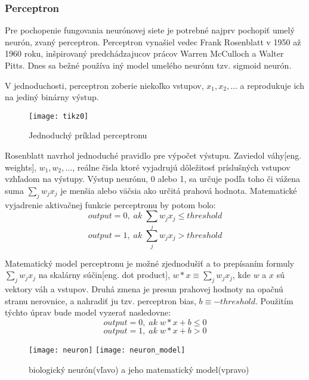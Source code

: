 \subsubsection{Perceptron}
Pre pochopenie fungovania neurónovej siete je potrebné najprv pochopiť umelý neurón, zvaný perceptron.
Perceptron vynašiel vedec Frank Rosenblatt v 1950 až 1960 roku, inšpirovaný predchádzajucov prácov Warren McCulloch a Walter Pitts.
Dnes sa bežné používa iný model umelého neurónu tzv. sigmoid neurón\cite{odkaz:HandwrittenDigitRecognision}.

V jednoduchosti, perceptron zoberie niekoľko vstupov, $x_1, x_2, \dots$ a reprodukuje ich na jediný binárny výstup.
\begin{figure}[H]
	\centering
	\texttt{[image: tikz0]}
	\caption{Jednoduchý príklad perceptronu\cite{odkaz:HandwrittenDigitRecognision}}
	\label{pic:Perceptron}
\end{figure}
Rosenblatt navrhol jednoduché pravidlo pre výpočet výstupu.
Zaviedol váhy[eng. weights], $w_1, w_2, \dots$,
    reálne čisla ktoré vyjadrujú dôležitosť príslušných vstupov vzhľadom na výstupy.
Výstup neurónu, 0 alebo 1, sa určuje podľa toho či vážena suma $\sum_j w_j x_j$ je menšia alebo väčsia ako určitá prahová hodnota.
Matematické vyjadrenie aktivačnej funkcie perceptronu by potom bolo\cite{odkaz:HandwrittenDigitRecognision}:
\begin{equation}
    output = 0, \; ak \; \sum_j w_j x_j \leq threshold
\end{equation}
\begin{equation}
    output = 1, \; ak \; \sum_j w_j x_j > threshold
\end{equation}

Matematický model perceptronu je možné zjednodušiť a to prepísaním formuly $\sum_j w_j x_j$ na skalárny súčin[eng. dot product],
    $w*x \equiv \sum_j w_j x_j$, kde $w$ a $x$ sú vektory váh a vstupov.
Druhá zmena je presun prahovej hodnoty na opačnú stranu nerovnice, a nahradiť ju tzv. perceptron bias, $b \equiv -threshold$.
Použitím týchto úprav bude model vyzerať nasledovne\cite{odkaz:HandwrittenDigitRecognision}:
\begin{equation}
    output = 0, \; ak \; w*x + b \leq 0
\end{equation}
\begin{equation}
    output = 1, \; ak \; w*x + b > 0
\end{equation}

\begin{figure}[H]
    \centering
    \texttt{[image: neuron]}
    \qquad
    \texttt{[image: neuron\_model]}
    \caption{biologický neurón(vľavo) a jeho matematický model(vpravo)\cite{odkaz:ConvolutionalNeuralNetworkCS231n}}
    \label{pic:Neuron}
\end{figure}

